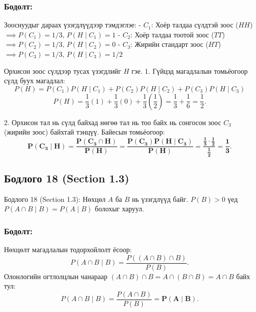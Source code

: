\documentclass[11pt,a4paper]{article}
\begin{document}
\subsubsection*{Бодолт:}

Зооснуудыг дараах үзэгдлүүдээр тэмдэглэе:
- $C_1$: Хоёр талдаа сүлдтэй зоос ($HH$) $\implies P(C_1) = 1/3, \, P(H \mid C_1) = 1$
- $C_2$: Хоёр талдаа тоотой зоос ($TT$) $\implies P(C_2) = 1/3, \, P(H \mid C_2) = 0$
- $C_3$: Жирийн стандарт зоос ($HT$) $\implies P(C_3) = 1/3, \, P(H \mid C_3) = 1/2$

Орхисон зоос сүлдээр тусах үзэгдлийг $H$ гэе.
1. Гүйцэд магадлалын томьёогоор сүлд буух магадлал:
   \[
     P(H) = P(C_1)P(H \mid C_1) + P(C_2)P(H \mid C_2) + P(C_3)P(H \mid C_3)
   \]
   \[
     P(H) = \frac{1}{3}(1) + \frac{1}{3}(0) + \frac{1}{3}\left(\frac{1}{2}\right) = \frac{1}{3} + \frac{1}{6} = \frac{1}{2}.
   \]

2. Орхисон тал нь сүлд байхад нөгөө тал нь тоо байх нь сонгосон зоос $C_3$ (жирийн зоос) байхтай тэнцүү. Байесын томьёогоор:
   \[
     \mathbf{P(C_3 \mid H) = \frac{P(C_3 \cap H)}{P(H)} = \frac{P(C_3)P(H \mid C_3)}{P(H)} = \frac{\frac{1}{3} \cdot \frac{1}{2}}{\frac{1}{2}} = \frac{1}{3}}.
   \]

\vspace{0.8em}

\subsection*{Бодлого 18 (Section 1.3)}

\begin{problembox}{Бодлого 18 (Section 1.3): Нөхцөл}
$A$ ба $B$ нь үзэгдлүүд байг. $P(B) > 0$ үед $P(A \cap B \mid B) = P(A \mid B)$ болохыг харуул.
\end{problembox}

\subsubsection*{Бодолт:}

Нөхцөлт магадлалын тодорхойлолт ёсоор:
\[
  P(A \cap B \mid B) = \frac{P((A \cap B) \cap B)}{P(B)}.
\]
Олонлогийн огтлолцлын чанараар $(A \cap B) \cap B = A \cap (B \cap B) = A \cap B$ байх тул:
\[
  P(A \cap B \mid B) = \frac{P(A \cap B)}{P(B)} = \mathbf{P(A \mid B)}.
\]
\end{document}
